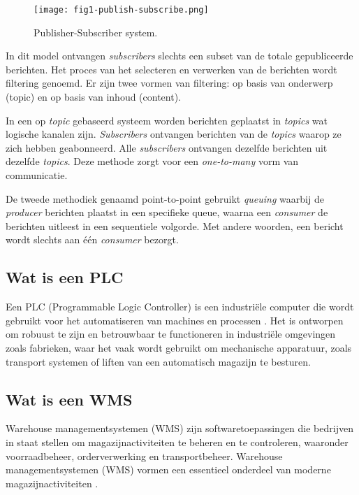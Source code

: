 \begin{figure}[h]
  \centering
  \texttt{[image: fig1-publish-subscribe.png]}
  \caption{\label{fig:img}Publisher-Subscriber system\autocite{Sharvari2019}.}
\end{figure}

In dit model ontvangen \emph{subscribers} slechts een subset van de totale gepubliceerde berichten. 
Het proces van het selecteren en verwerken van de berichten wordt filtering genoemd. 
Er zijn twee vormen van filtering: op basis van onderwerp (topic) en op basis van inhoud (content).
\newline

In een op \emph{topic} gebaseerd systeem worden berichten geplaatst in \emph{topics} wat logische kanalen zijn.
\emph{Subscribers} ontvangen berichten van de \emph{topics} waarop ze zich hebben geabonneerd.
Alle \emph{subscribers} ontvangen dezelfde berichten uit dezelfde \emph{topics}. 
Deze methode zorgt voor een \emph{one-to-many} vorm van communicatie.
\newline

De tweede methodiek genaamd point-to-point gebruikt \emph{queuing} waarbij de \emph{producer} berichten plaatst in een specifieke queue, 
waarna een \emph{consumer} de berichten uitleest in een sequentiele volgorde. 
Met andere woorden, een bericht wordt slechts aan één \emph{consumer} bezorgt.

\subsection{Wat is een PLC}
Een PLC (Programmable Logic Controller) is een industriële computer die wordt gebruikt voor het automatiseren van machines en processen \autocite{Bolton2015}. 
Het is ontworpen om robuust te zijn en betrouwbaar te functioneren in industriële omgevingen zoals fabrieken, 
waar het vaak wordt gebruikt om mechanische apparatuur, zoals transport systemen of liften van een automatisch magazijn te besturen.

\subsection{Wat is een WMS}
Warehouse managementsystemen (WMS) zijn softwaretoepassingen die bedrijven in staat stellen om magazijnactiviteiten te beheren en te controleren, 
waaronder voorraadbeheer, orderverwerking en transportbeheer. 
Warehouse managementsystemen (WMS) vormen een essentieel onderdeel van moderne magazijnactiviteiten \autocite{Rana2023}. \newline

